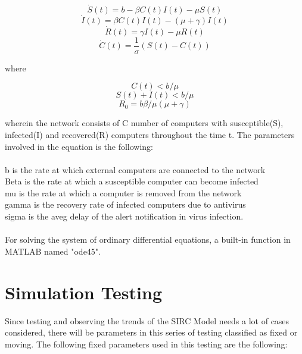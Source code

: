 \documentclass{acm_proc_article-sp}
\begin{document}
\begin{equation}
\dot{S}(t) = b - \beta C(t)I(t) - \mu S(t)
\end{equation}
\begin{equation}
\dot{I}(t) = \beta C(t)I(t) - (\mu + \gamma)I(t)
\end{equation}
\begin{equation}
\dot{R}(t) = \gamma I(t) - \mu R(t)
\end{equation}
\begin{equation}
\dot{C}(t) = \frac{1}{\sigma}(S(t) - C(t))
\end{equation}

where

\begin{equation}
C(t) < b/\mu
\end{equation}
\begin{equation}
S(t) + I(t) < b/\mu
\end{equation}
\begin{equation}
R_0 = b\beta/\mu(\mu+\gamma)
\end{equation}



wherein the network consists of C number of computers with susceptible(S), infected(I) and recovered(R) computers throughout the time t. The parameters involved in the equation is the following:\\\\
b is the rate at which external computers are connected to the network\\
Beta is the rate at which a susceptible computer can become infected\\
mu is the rate at which a computer is removed from the network\\
gamma is the recovery rate of infected computers due to antivirus\\
sigma is the aveg delay of the alert notification in virus infection.\\\\
For solving the system of ordinary differential equations, a built-in function in MATLAB named "ode45".

\section{Simulation Testing}
Since testing and observing the trends of the SIRC Model needs a lot of cases considered, there will be parameters in this series of testing classified as fixed or moving. The following fixed parameters used in this testing are the following:
\end{document}
